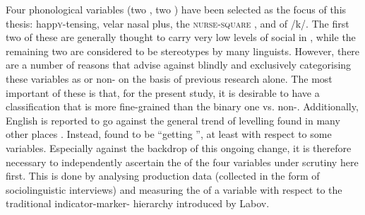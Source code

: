 Four phonological variables (two , two ) have been selected as the focus of this thesis: happ\textsc{y}-tensing, velar nasal plus, the \textsc{nurse}-\textsc{square} , and  of /k/.
The first two of these are generally thought to carry very low levels of social  in , while the remaining two are considered to be stereotypes by many linguists.
However, there are a number of reasons that advise against blindly and exclusively categorising these variables as  or non- on the basis of previous research alone.
The most important of these is that, for the present study, it is desirable to have a classification that is more fine-grained than the binary one  vs. non-.
Additionally,  English is reported to go against the general trend of  levelling found in many other places \parencite{kerswill2003}.
Instead, \textcite[237]{watson2007a} found  to be ``getting '', at least with respect to some variables.
Especially against the backdrop of this ongoing change, it is therefore necessary to independently ascertain the  of the four variables under scrutiny here first.
This is done by analysing production data (collected in the form of sociolinguistic interviews) and measuring the  of a variable with respect to the traditional indicator-marker- hierarchy introduced by Labov.

